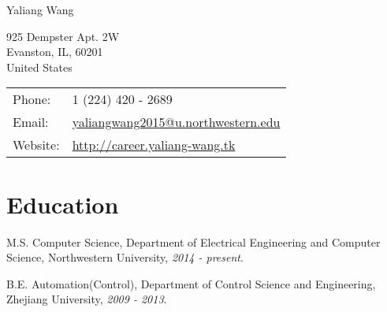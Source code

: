 \documentclass[letterpaper]{article}
\def\name{Yaliang Wang}
\renewenvironment{itemize}{
  \begin{list}{}{
    \setlength{\leftmargin}{1.5em}
  }
}{
  \end{list}
}
\begin{document}
{\huge \name}


\vspace{0.25in}

\begin{minipage}{0.45\linewidth}
  925 Dempster Apt. 2W \\
  Evanston, IL, 60201 \\
  United States 
  
\end{minipage}
\begin{minipage}{0.45\linewidth}
  \begin{tabular}{ll}
    Phone: & 1 (224) 420 - 2689 \\
    Email: & \href{mailto:yaliangwang2015@u.northwestern.edu}{yaliangwang2015@u.northwestern.edu} \\
    Website: & \href{http://career.yaliang-wang.tk}{http://career.yaliang-wang.tk} \\
  \end{tabular}
\end{minipage}


%

%

\section*{Education}

\begin{itemize}
  \item M.S. Computer Science, Department of Electrical Engineering and Computer Science, Northwestern University, {\it 2014 - present}.
  \item B.E. Automation(Control), Department of Control Science and Engineering, Zhejiang University, {\it 2009 - 2013}.
\end{itemize}
\end{document}
